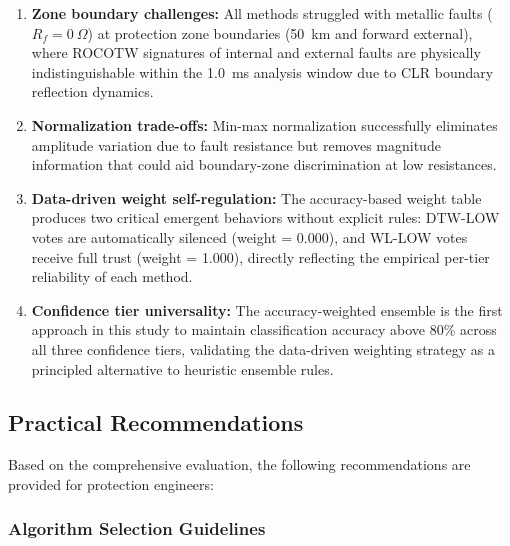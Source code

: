 \documentclass[journal]{IEEEtran}
\begin{document}
\begin{enumerate}
    \item \textbf{Zone boundary challenges:} All methods struggled with
    metallic faults ($R_f = 0~\Omega$) at protection zone boundaries
    (50~km and forward external), where ROCOTW signatures of internal
    and external faults are physically indistinguishable within the
    1.0~ms analysis window due to CLR boundary reflection dynamics.

    \item \textbf{Normalization trade-offs:} Min-max normalization
    successfully eliminates amplitude variation due to fault resistance
    but removes magnitude information that could aid boundary-zone
    discrimination at low resistances.

    \item \textbf{Data-driven weight self-regulation:} The accuracy-based
    weight table produces two critical emergent behaviors without
    explicit rules: DTW-LOW votes are automatically silenced (weight =
    0.000), and WL-LOW votes receive full trust (weight = 1.000),
    directly reflecting the empirical per-tier reliability of each
    method.

    \item \textbf{Confidence tier universality:} The accuracy-weighted
    ensemble is the first approach in this study to maintain
    classification accuracy above 80\% across all three confidence
    tiers, validating the data-driven weighting strategy as a
    principled alternative to heuristic ensemble rules.
\end{enumerate}

\subsection{Practical Recommendations}

Based on the comprehensive evaluation, the following recommendations are provided for protection engineers:

\subsubsection{Algorithm Selection Guidelines}
\end{document}
